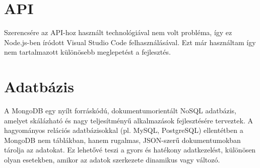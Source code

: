 \documentclass{thesis-ekf}
\theoremstyle{definition}
\theoremstyle{remark}
\begin{document}
	\section{API}
	Szerencsére az API-hoz használt technológiával nem volt probléma, így ez Node.js-ben íródott Visual Studio Code felhasználásával. Ezt már használtam így nem tartalmazott különösebb meglepetést a fejlesztés.
	\section{Adatbázis}
	A MongoDB egy nyílt forráskódú, dokumentumorientált NoSQL adatbázis, amelyet skálázható és nagy teljesítményű alkalmazások fejlesztésére terveztek. A hagyományos relációs adatbázisokkal (pl. MySQL, PostgreSQL) ellentétben a MongoDB nem táblákban, hanem rugalmas, JSON-szerű dokumentumokban tárolja az adatokat. Ez lehetővé teszi a gyors és hatékony adatkezelést, különösen olyan esetekben, amikor az adatok szerkezete dinamikus vagy változó.
	
\end{document}
